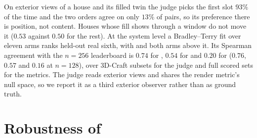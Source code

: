 \begin{table}[h]
\centering
\small
\setlength{\tabcolsep}{3pt}
\caption{Probability the judge prefers the first arm, with cluster-bootstrap $95\%$
intervals. Every pre-registered prediction holds except the last, where the judge agrees
with both metrics.}
\label{tab:vlm}
\end{table}

On exterior views of a house and its filled twin the judge picks the first slot $93\%$ of
the time and the two orders agree on only $13\%$ of pairs, so its preference there is
position, not content. Houses whose fill shows through a window do not move it ($0.53$
against $0.50$ for the rest). At the system level a
Bradley--Terry fit over eleven arms ranks held-out real sixth, with \solidify{} and both
\voxar{} arms above it. Its Spearman agreement with the $n{=}256$ leaderboard is $0.74$ for
\mvkid{}, $0.54$ for \blockscore{} and $0.20$ for \vkid{} ($0.76$, $0.57$ and $0.16$ at
$n{=}128$), over 3D-Craft subsets for the judge and full scored sets for the metrics. The
judge reads exterior views and shares the render metric's null space, so we report it as a
third exterior observer rather than as ground truth.

\section{Robustness of \vkid{}}
\label{app:vkid-robust}

